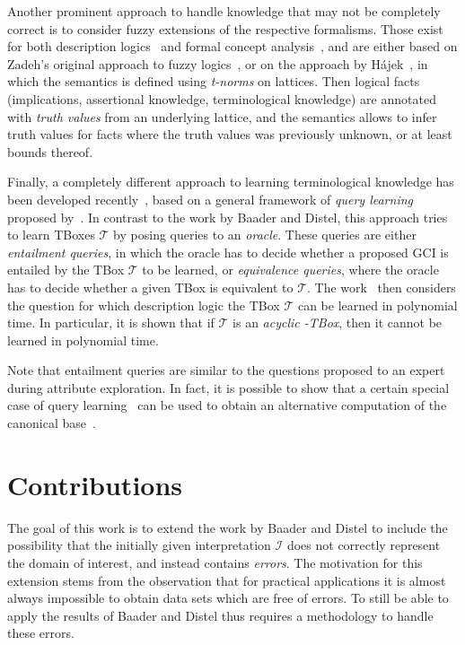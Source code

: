 Another prominent approach to handle knowledge that may not be completely correct is to
consider fuzzy extensions of the respective formalisms.  Those exist for both description
logics~\cite{journals/fss/BobilloS09,journals/ws/LukasiewiczS08} and formal concept
analysis~\cite{Pollandt97b,conf/cla/BelohlavekV05}, and are either based on Zadeh's
original approach to fuzzy logics~\cite{journals/iandc/Zadeh65}, or on the approach by
Hájek~\cite{hajek1998metamathematics}, in which the semantics is defined using
\emph{t-norms} on lattices.  Then logical facts (implications, assertional knowledge,
terminological knowledge) are annotated with \emph{truth values} from an underlying
lattice, and the semantics allows to infer truth values for facts where the truth values
was previously unknown, or at least bounds thereof.

Finally, a completely different approach to learning terminological knowledge has been
developed recently~\cite{conf/dlog/KonevLW13}, based on a general framework of \emph{query
  learning} proposed by~\cite{journals/ml/Angluin87}.  In contrast to the work by Baader
and Distel, this approach tries to learn TBoxes $\mathcal{T}$ by posing queries to an
\emph{oracle}.  These queries are either \emph{entailment queries}, in which the oracle
has to decide whether a proposed GCI is entailed by the TBox $\mathcal{T}$ to be learned,
or \emph{equivalence queries}, where the oracle has to decide whether a given TBox is
equivalent to $\mathcal{T}$.  The work~\cite{conf/dlog/KonevLW13} then considers
the question for which description logic the TBox $\mathcal{T}$ can be learned in
polynomial time.  In particular, it is shown that if $\mathcal{T}$ is an \emph{acyclic
  \EL-TBox}, then it cannot be learned in polynomial time.

Note that entailment queries are similar to the questions proposed to an expert during
attribute exploration.  In fact, it is possible to show that a certain special case of
query learning~\cite{journals/ml/AngluinFP92} can be used to obtain an alternative
computation of the canonical base~\cite{journals/ml/AriasB11}.

\section{Contributions}
\label{sec:contributions}

The goal of this work is to extend the work by Baader and Distel to include the
possibility that the initially given interpretation $\mathcal{I}$ does not correctly
represent the domain of interest, and instead contains \emph{errors}.  The motivation for
this extension stems from the observation that for practical applications it is almost
always impossible to obtain data sets which are free of errors.  To still be able to apply
the results of Baader and Distel thus requires a methodology to handle these errors.

